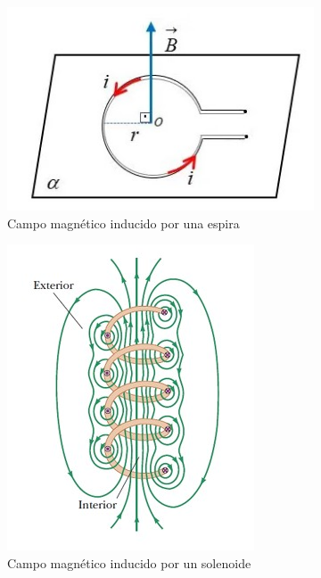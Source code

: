 \documentclass[arial,a4paper,print]{article}
\begin{document}
\begin{figure}
	\centering
	\hfill
	\begin{subfigure}[b]{0.5\textwidth}
		\centering
		\includegraphics[width=\textwidth]{figures/espira}
		\caption{Campo magnético inducido por una espira}
		\label{fig:espira}
	\end{subfigure}
	\hfill
	\begin{subfigure}[b]{0.25\textwidth}
		\centering
		\includegraphics[width=\textwidth]{figures/solenoide}
		\caption{Campo magnético inducido por un solenoide}
		\label{fig:five over x}
	\end{subfigure}
	\caption{}
	\label{fig:solenoide}
\end{figure}
\end{document}

